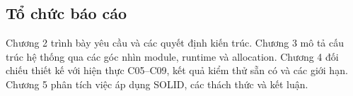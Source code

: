 \subsection{Tổ chức báo cáo}
\label{subsec:report-structure}
Chương 2 trình bày yêu cầu và các quyết định kiến trúc. Chương 3 mô tả cấu trúc hệ thống qua các góc nhìn module, runtime và allocation. Chương 4 đối chiếu thiết kế với hiện thực C05--C09, kết quả kiểm thử sẵn có và các giới hạn. Chương 5 phân tích việc áp dụng SOLID, các thách thức và kết luận.



